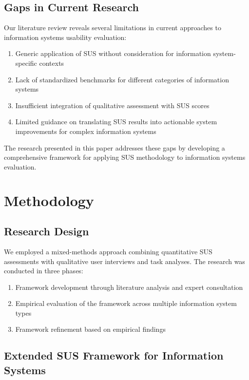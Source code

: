 \documentclass[blindrev]{informs3}
\begin{document}
\subsection{Gaps in Current Research}\label{research-gaps}

Our literature review reveals several limitations in current approaches to information systems usability evaluation:

\begin{enumerate}
    \item Generic application of SUS without consideration for information system-specific contexts
    \item Lack of standardized benchmarks for different categories of information systems
    \item Insufficient integration of qualitative assessment with SUS scores
    \item Limited guidance on translating SUS results into actionable system improvements for complex information systems
\end{enumerate}

The research presented in this paper addresses these gaps by developing a comprehensive framework for applying SUS methodology to information systems evaluation.

\section{Methodology}\label{methodology}

\subsection{Research Design}\label{research-design}

We employed a mixed-methods approach combining quantitative SUS assessments with qualitative user interviews and task analyses. The research was conducted in three phases:

\begin{enumerate}
    \item Framework development through literature analysis and expert consultation
    \item Empirical evaluation of the framework across multiple information system types
    \item Framework refinement based on empirical findings
\end{enumerate}

\subsection{Extended SUS Framework for Information Systems}\label{extended-framework}
\end{document}
